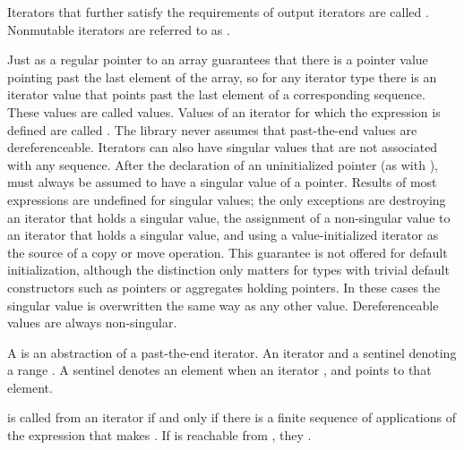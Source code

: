 \pnum
Iterators that further satisfy the requirements of output iterators are
called . Nonmutable iterators are referred to
as .

\pnum
Just as a regular pointer to an array guarantees that there is a pointer value pointing past the last element
of the array, so for any iterator type there is an iterator value that points past the last element of a
corresponding sequence.
These values are called
values.
Values of an iterator
for which the expression
is defined are called
.
The library never assumes that past-the-end values are dereferenceable.
Iterators can also have singular values that are not associated with any
sequence.
\enterexample
After the declaration of an uninitialized pointer
(as with
),
must always be assumed to have a singular value of a pointer.
\exitexample
Results of most expressions are undefined for singular values;
the only exceptions are destroying an iterator that holds a singular value,
the assignment of a non-singular value to
an iterator that holds a singular value, and using a value-initialized iterator
as the source of a copy or move operation. \enternote This guarantee is not
offered for default initialization, although the distinction only matters for types
with trivial default constructors such as pointers or aggregates holding pointers.
\exitnote
In these cases the singular
value is overwritten the same way as any other value.
Dereferenceable
values are always non-singular.

\begin{addedblock}
\pnum
A
is an abstraction of a past-the-end iterator.  An iterator and a sentinel denoting a range
.
A sentinel denotes an element when
an iterator , and
 points to that element. 
\end{addedblock}

\pnum
{}
is called
from an iterator
if and only if there is a finite sequence of applications of
the expression
that makes
.
If
is reachable from
,
they .

